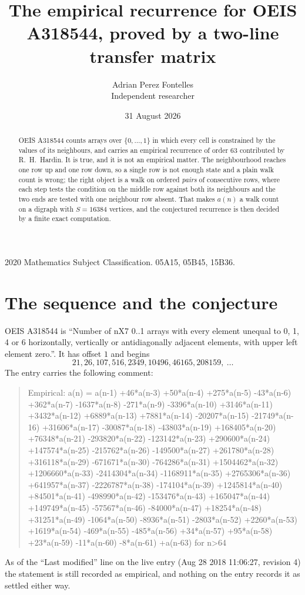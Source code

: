\documentclass[11pt,a4paper]{article}
\title{The empirical recurrence for OEIS A318544, proved by a two-line transfer matrix}
\author{Adrian Perez Fontelles\\ \small Independent researcher}
\date{31 August 2026}
\theoremstyle{plain}
\theoremstyle{definition}
\begin{document}
\maketitle

\begin{abstract}
OEIS A318544 counts arrays over $\{0,\dots,1\}$ in which every cell is constrained by the
values of its neighbours, and carries an empirical recurrence of order $63$ contributed
by R.~H.~Hardin. It is true, and it is not an empirical matter. The neighbourhood reaches one
row up and one row down, so a single row is not enough state and a plain walk count
is wrong; the right object is a walk on ordered \emph{pairs} of consecutive rows, where
each step tests the condition on the middle row against both its neighbours and the two
ends are tested with one neighbour row absent. That makes $a(n)$ a walk count on a digraph
with $S=16384$ vertices, and the conjectured recurrence is then decided by a finite exact
computation.
\end{abstract}

\noindent\small 2020 Mathematics Subject Classification. 05A15, 05B45, 15B36.\normalsize

\section{The sequence and the conjecture}

OEIS A318544 is ``Number of nX7 0..1 arrays with every element unequal to 0, 1, 4 or 6 horizontally, vertically or antidiagonally adjacent elements, with upper left element zero.''. It has offset $1$ and begins
\[
21, 26, 107, 516, 2349, 10496, 46165, 208159,\ \dots
\]
The entry carries the following comment:
\begin{quote}\small
Empirical: a(n) = a(n-1) +46*a(n-3) +50*a(n-4) +275*a(n-5) -43*a(n-6) +362*a(n-7) -1637*a(n-8) -271*a(n-9) -3396*a(n-10) +3146*a(n-11) +3432*a(n-12) +6889*a(n-13) +7881*a(n-14) -20207*a(n-15) -21749*a(n-16) +31606*a(n-17) -30087*a(n-18) -43803*a(n-19) +168405*a(n-20) +76348*a(n-21) -293820*a(n-22) -123142*a(n-23) +290600*a(n-24) +147574*a(n-25) -215762*a(n-26) -149500*a(n-27) +261780*a(n-28) +316118*a(n-29) -671671*a(n-30) -764286*a(n-31) +1504462*a(n-32) +1206660*a(n-33) -2414304*a(n-34) -1168911*a(n-35) +2765306*a(n-36) +641957*a(n-37) -2226787*a(n-38) -174104*a(n-39) +1245814*a(n-40) +84501*a(n-41) -498990*a(n-42) -153476*a(n-43) +165047*a(n-44) +149749*a(n-45) -57567*a(n-46) -84000*a(n-47) +18254*a(n-48) +31251*a(n-49) -1064*a(n-50) -8936*a(n-51) -2803*a(n-52) +2260*a(n-53) +1619*a(n-54) -469*a(n-55) -485*a(n-56) +34*a(n-57) +95*a(n-58) +23*a(n-59) -11*a(n-60) -8*a(n-61) +a(n-63) for n>64
\end{quote}
As of the ``Last modified'' line on the live entry (Aug 28 2018 11:06:27, revision 4) the statement is
still recorded as empirical, and nothing on the entry records it as settled either way.
\end{document}

